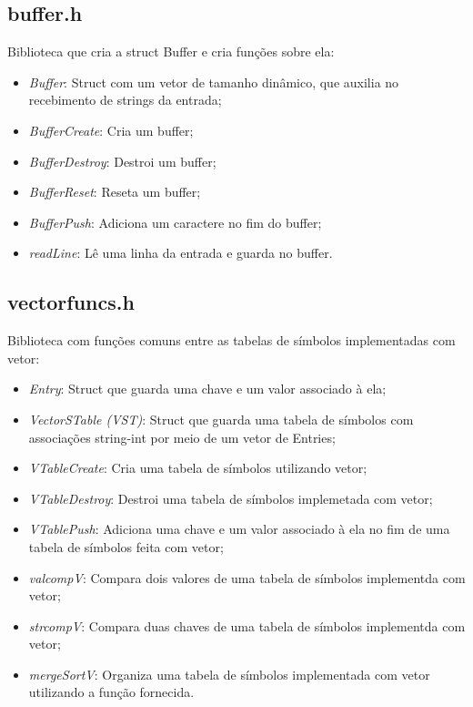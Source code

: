\documentclass[12pt, a4paper]{article} %
\begin{document}
	\subsection{buffer.h}
	Biblioteca que cria a struct Buffer e cria funções sobre ela:
	\begin{itemize}
		\item \textit{Buffer}: Struct com um vetor de tamanho dinâmico, que auxilia no recebimento de strings da entrada;
		\item \textit{BufferCreate}: Cria um buffer;
		\item \textit{BufferDestroy}: Destroi um buffer;
		\item \textit{BufferReset}: Reseta um buffer;
		\item \textit{BufferPush}: Adiciona um caractere no fim do buffer;
		\item \textit{readLine}: Lê uma linha da entrada e guarda no buffer.
	\end{itemize}

	\subsection{vectorfuncs.h}
	Biblioteca com funções comuns entre as tabelas de símbolos implementadas com 		vetor:
	\begin{itemize}
		\item \textit{Entry}: Struct que guarda uma chave e um valor associado à ela;
		\item \textit{VectorSTable (VST)}: Struct que guarda uma tabela de símbolos com associações string-int por meio de um vetor de Entries;
		\item \textit{VTableCreate}:  Cria uma tabela de símbolos utilizando vetor;
		\item \textit{VTableDestroy}: Destroi uma tabela de símbolos implemetada com vetor;
		\item \textit{VTablePush}: Adiciona uma chave e um valor associado à ela no fim de uma tabela de símbolos feita com vetor;
		\item \textit{valcompV}: Compara dois valores de uma tabela de símbolos implementda com vetor;
		\item \textit{strcompV}: Compara duas chaves de uma tabela de símbolos implementda com vetor;
		\item \textit{mergeSortV}: Organiza uma tabela de símbolos implementada com vetor utilizando a função fornecida.
	\end{itemize}
\end{document}
